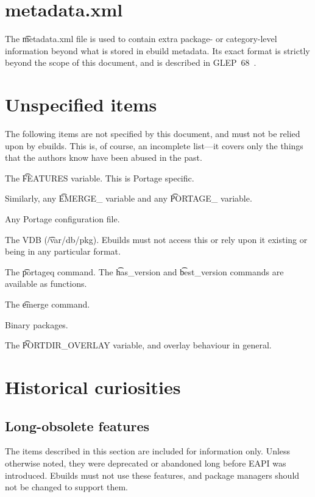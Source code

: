 \chapter{metadata.xml}
\label{app:metadata-xml}

The \t{metadata.xml} file is used to contain extra package- or category-level information beyond
what is stored in ebuild metadata. Its exact format is strictly beyond the scope of this document,
and is described in GLEP~68~\cite{glep68}.

\chapter{Unspecified items}

The following items are not specified by this document, and must not be relied upon by ebuilds.
This is, of course, an incomplete list---it covers only the things that the authors know have
been abused in the past.

\begin{compactitem}
\item The \t{FEATURES} variable. This is Portage specific.
\item Similarly, any \t{EMERGE_} variable and any \t{PORTAGE_} variable.
\item Any Portage configuration file.
\item The VDB (\t{/var/db/pkg}). Ebuilds must not access this or rely upon it existing or being
    in any particular format.
\item The \t{portageq} command. The \t{has_version} and \t{best_version} commands are
    available as functions.
\item The \t{emerge} command.
\item Binary packages.
\item The \t{PORTDIR_OVERLAY} variable, and overlay behaviour in general.
\end{compactitem}

\chapter{Historical curiosities}

\section{Long-obsolete features}

The items described in this section are included for information only. Unless otherwise noted, they
were deprecated or abandoned long before EAPI was introduced. Ebuilds must not use these features,
and package managers should not be changed to support them.

